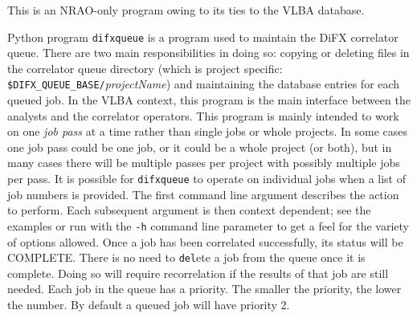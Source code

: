 This is an NRAO-only program owing to its ties to the VLBA database.

Python program {\tt difxqueue} is a program used to maintain the DiFX correlator queue.
There are two main responsibilities in doing so: copying or deleting files in the correlator queue directory (which is project specific: {\tt \$DIFX\_QUEUE\_BASE/}{\em projectName}) and maintaining the database entries for each queued job.
In the VLBA context, this program is the main interface between the analysts and the correlator operators.
This program is mainly intended to work on one {\em job pass} at a time rather than single jobs or whole projects.
In some cases one job pass could be one job, or it could be a whole project (or both), but in many cases there will be multiple passes per project with possibly multiple jobs per pass.
It is possible for {\tt difxqueue} to operate on individual jobs when a list of job numbers is provided.
The first command line argument describes the action to perform.
Each subsequent argument is then context dependent; see the examples or run with the {\tt -h} command line parameter to get a feel for the variety of options allowed.
Once a job has been correlated successfully, its status will be COMPLETE.
There is no need to {\tt del}ete a job from the queue once it is complete. 
Doing so will require recorrelation if the results of that job are still needed.
Each job in the queue has a priority.
The smaller the priority, the lower the number.
By default a queued job will have priority 2.

